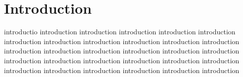 \chapter*{Introduction}


introductio introduction introduction introduction introduction introduction  introduction  introduction  introduction  introduction  introduction  introduction  introduction  introduction  introduction  introduction  introduction  introduction  introduction  introduction  introduction  introduction  introduction  introduction  introduction  introduction  introduction  introduction  introduction  introduction  